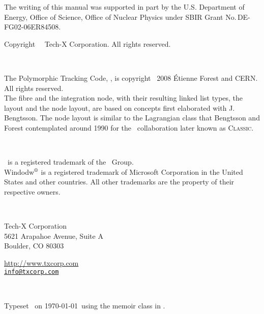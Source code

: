 
\clearpage
\thispagestyle{empty}

{\small
\noindent
The writing of this manual was supported in part by the
U.S. Department of Energy, Office of Science, Office of Nuclear Physics
under SBIR Grant No.\,DE-FG02-06ER84508.
}



\vfill
{\footnotesize
\setlength{\parindent}{0pt}
Copyright \textcopyright\ \PTCDocYear\ Tech-X Corporation. All rights reserved.

~\par
The Polymorphic Tracking Code, \PTC, is copyright \textcopyright\ 2008
\'Etienne Forest and CERN. All rights reserved.\\
The fibre and the integration node, with their resulting linked list
types, the layout and the node layout, are based on concepts first
elaborated with J. Bengtsson. The node layout is similar to the
Lagrangian class that Bengtsson and Forest contemplated around 1990
for the \Cpp\ collaboration later known as \textsc{Classic}.

~\par
\LEGOr\ is a registered trademark of the \LEGO\ Group.\\
Windodw$^\text{\textregistered}$ is a registered trademark of
Microsoft Corporation in the United States and other countries.
All other trademarks are the property of their respective owners.

~\par
Tech-X Corporation\\
5621 Arapahoe Avenue, Suite A\\
Boulder, CO 80303

\url{http://www.txcorp.com}\\
\href{mailto:info@txcorp.com}{\nolinkurl{info@txcorp.com}}

~\par
\dmydate
Typeset \currenttime\ on \today\ using the \textsf{memoir} class in \LaTeXe.
\vspace*{0.1\textheight}
}


\endinput
